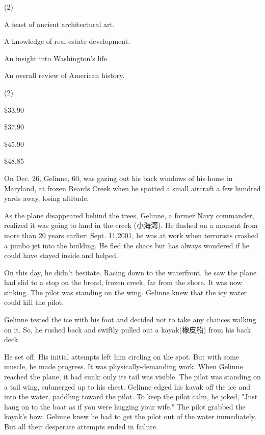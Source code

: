 \documentclass{英语试卷}
\begin{document}
\begin{choices}(2)
  \item A feast of ancient architectural art.
  \item A knowledge of real estate development.
  \item An insight into Washington's life.
  \item An overall review of American history.
\end{choices}
\begin{choices}(2)
  \item \$33.90
  \item \$37.90
  \item \$45.90
  \item \$48.85
\end{choices}
\par On Dec. 26, Gelinne, 60, was gazing out his back windows of his home in Maryland, at frozen Beards Creek when he spotted a small aircraft a few hundred yards away, losing altitude.\par
\par As the plane disappeared behind the trees, Gelinne, a former Navy commander, realized it was going to land in the creek (小海湾). He flashed on a moment from more than 20 years earlier: Sept. 11,2001, he was at work when terrorists crashed a jumbo jet into the building. He fled the chaos but has always wondered if he could have stayed inside and helped.\par
\par On this day, he didn't hesitate. Racing down to the waterfront, he saw the plane had slid to a stop on the broad, frozen creek, far from the shore. It was now sinking. The pilot was standing on the wing. Gelinne knew that the icy water could kill the pilot.\par
\par Gelinne tested the ice with his foot and decided not to take any chances walking on it. So, he rushed back and swiftly pulled out a kayak(橡皮船) from his back deck.\par
\par He set off. His initial attempts left him circling on the spot. But with some muscle, he made progress. It was physically-demanding work. When Gelinne reached the plane, it had sunk; only its tail was visible. The pilot was standing on a tail wing, submerged up to his chest. Gelinne edged his kayak off the ice and into the water, paddling toward the pilot. To keep the pilot calm, he joked, "Just hang on to the boat as if you were hugging your wife." The pilot grabbed the kayak's bow. Gelinne knew he had to get the pilot out of the water immediately. But all their desperate attempts ended in failure.\par
\end{document}
